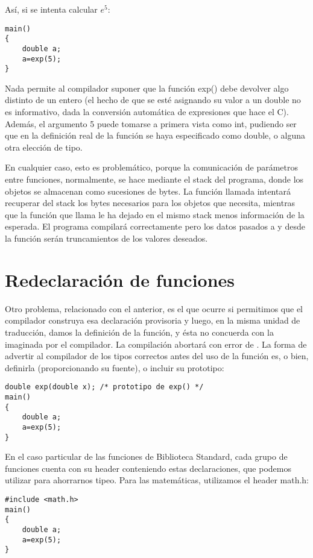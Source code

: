 Así, si se intenta calcular $e^5$:
\begin{lstlisting}
main()
{
    double a;
    a=exp(5);
}
\end{lstlisting}

Nada permite al compilador suponer que la función exp() debe devolver algo
distinto de un entero (el hecho de que se esté asignando su valor a un double
no es informativo, dada la conversión automática de expresiones que hace el C).
Además, el argumento 5 puede tomarse a primera vista como int, pudiendo ser que
en la definición real de la función se haya especificado como double, o alguna
otra elección de tipo.

En cualquier caso, esto es problemático, porque la comunicación de parámetros
entre funciones, normalmente, se hace mediante el stack del programa, donde los
objetos se almacenan como sucesiones de bytes. La función llamada intentará
recuperar del stack los bytes necesarios para  los objetos que necesita,
mientras que la función que llama le ha dejado en el mismo stack menos
información de la esperada. El programa compilará correctamente pero los datos
pasados a y desde la función serán truncamientos de los valores deseados.

\section{Redeclaración de funciones}
Otro problema, relacionado con el anterior, es el que ocurre si permitimos que
el compilador construya esa declaración provisoria y luego, en la misma unidad
de traducción, damos la definición de la función, y ésta no concuerda con la
imaginada por el compilador. La compilación abortará con error de
.
La forma de advertir al compilador de los tipos correctos antes del uso de la
función es, o bien, definirla (proporcionando su fuente), o incluir su
prototipo:
\begin{lstlisting}
double exp(double x); /* prototipo de exp() */
main()
{
    double a;
    a=exp(5);
}
\end{lstlisting}

En el caso particular de las funciones de Biblioteca Standard, cada grupo de
funciones cuenta con su header conteniendo estas declaraciones, que podemos
utilizar para ahorrarnos tipeo. Para las matemáticas, utilizamos el header
math.h:
\begin{lstlisting}
#include <math.h>
main()
{
    double a;
    a=exp(5);
}
\end{lstlisting}

